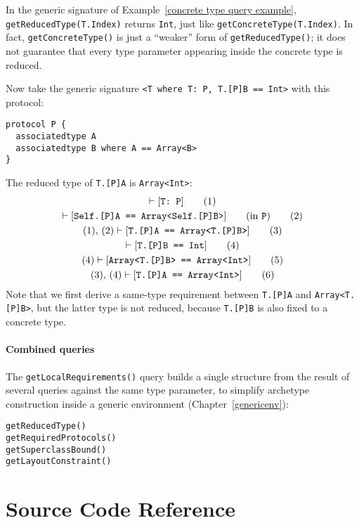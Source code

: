 \documentclass[../generics]{subfiles}
\begin{document}
\begin{example}
In the generic signature of Example~\ref{concrete type query example}, \texttt{getReducedType(T.Index)} returns \texttt{Int}, just like \texttt{getConcreteType(T.Index)}. In fact, \texttt{getConcreteType()} is just a ``weaker'' form of \texttt{getReducedType()}; it does not guarantee that every type parameter appearing inside the concrete type is reduced.

Now take the generic signature \verb|<T where T: P, T.[P]B == Int>| with this protocol:
\begin{Verbatim}
protocol P {
  associatedtype A
  associatedtype B where A == Array<B>
}
\end{Verbatim}
The reduced type of \texttt{T.[P]A} is \texttt{Array<Int>}:
\begin{gather}
\vdash [\texttt{T:~P}]\tag{1}\\
\vdash [\texttt{Self.[P]A == Array<Self.[P]B>}]\qquad\mbox{(in \texttt{P})}\tag{2}\\
(1),\,(2)\vdash [\texttt{T.[P]A == Array<T.[P]B>}]\tag{3}\\
\vdash [\texttt{T.[P]B == Int}]\tag{4}\\
(4)\vdash [\texttt{Array<T.[P]B> == Array<Int>}]\tag{5}\\
(3),\,(4)\vdash[\texttt{T.[P]A == Array<Int>}]\tag{6}
\end{gather}
Note that we first derive a same-type requirement between \texttt{T.[P]A} and \texttt{Array<T.[P]B>}, but the latter type is not reduced, because \texttt{T.[P]B} is also fixed to a concrete type.
\end{example}

\paragraph{Combined queries}


The \texttt{getLocalRequirements()} query builds a single structure from the result of several queries against the same type parameter, to simplify archetype construction inside a generic environment (Chapter~\ref{genericenv}):
\begin{verbatim}
getReducedType()
getRequiredProtocols()
getSuperclassBound()
getLayoutConstraint()
\end{verbatim}

\section{Source Code Reference}\label{genericsigsourceref}
\end{document}
